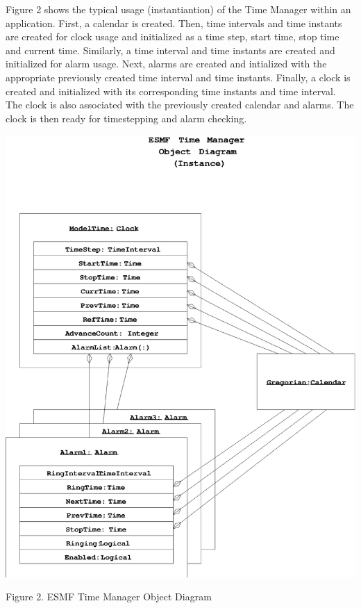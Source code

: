 

Figure 2 shows the typical usage (instantiantion) of the Time Manager
within an application.  First, a calendar is created.  Then, time intervals
and time instants are created for clock usage and initialized as a time step,
start time, stop time and current time.  Similarly, a time interval and time 
instants are created and initialized for alarm usage.  Next, alarms are
created and intialized with the appropriate previously created time interval
and time instants.  Finally, a clock is created and initialized with its
corresponding time instants and time interval.  The clock is also associated
with the previously created calendar and alarms.  The clock is then ready
for timestepping and alarm checking.

\begin{center}
\includegraphics{TimeMgrObject.EPS}
   
Figure 2.  ESMF Time Manager Object Diagram
   
\end{center}

